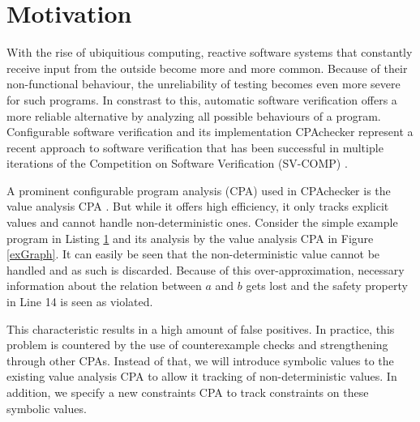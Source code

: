 \section{Motivation}
With the rise of ubiquitious computing, reactive software systems that constantly receive input from the outside become more and more common.
Because of their non\--func\-tio\-nal behaviour, the unreliability of testing becomes even more severe for such programs.
In constrast to this, automatic software verification offers a more reliable alternative by analyzing all possible behaviours of a program.
Configurable software verification\cite{Beyer2007} and its implementation CPAchecker\cite{Beyer2011} represent a recent approach to software verification that has been successful in
multiple iterations of the Competition on Software Verification (SV-COMP) \cite{SV-COMP2013} \cite{SV-COMP2014} \cite{SV-COMP2015}.

A prominent configurable program analysis (CPA) used in CPAchecker is the value analysis CPA \cite{Beyer2013}.
But while it offers high efficiency, it only tracks explicit values and cannot handle non-deterministic ones.
Consider the simple example program in Listing \ref{exProg} and its analysis by the value analysis CPA in Figure \ref{exGraph}.
It can easily be seen that the non-deterministic value cannot be handled and as such is discarded.
Because of this over-approximation, necessary information about the relation between $a$ and $b$ gets lost and the safety property in Line 14 is seen as violated.

\begin{figure}[h]
\label{exProg}
\lstset{numbers=left}

\end{figure}

This characteristic results in a high amount of false positives.
In practice, this problem is countered by the use of counterexample checks and strengthening through other CPAs.
Instead of that, we will introduce symbolic values to the existing value analysis CPA to allow it tracking of non-deterministic values.
In addition, we specify a new constraints CPA to track constraints on these symbolic values.

